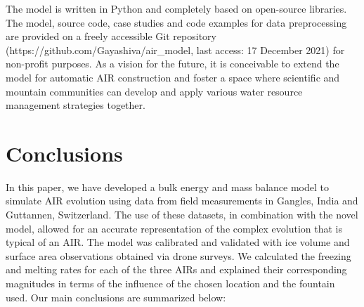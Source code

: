 \documentclass[utf8]{frontiersSCNS}
\begin{document}
The model is written in Python and completely based on open-source libraries. The model, source code, case
studies and code examples for data preprocessing are provided on a freely accessible Git repository
(https://github.com/Gayashiva/air\_model, last access: 17 December 2021) for non-profit purposes. As a vision
for the future, it is conceivable to extend the model for automatic AIR construction and foster a space where
scientific and mountain communities can develop and apply various water resource management strategies together.

\section{Conclusions}

In this paper, we have developed a bulk energy and mass balance model to simulate AIR evolution using data from
field measurements in Gangles, India and Guttannen, Switzerland. The use of these datasets, in combination with
the novel model, allowed for an accurate representation of the complex evolution that is typical of an AIR. The model was
calibrated and validated with ice volume and surface area observations obtained via drone surveys. We calculated
the freezing and melting rates for each of the three AIRs and explained their corresponding magnitudes in terms
of the influence of the chosen location and the fountain used. Our main conclusions are summarized below:
\end{document}
